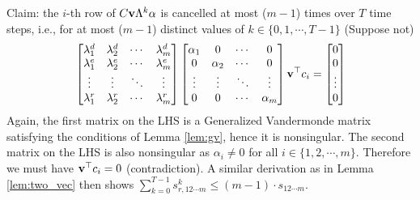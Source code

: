 \begin{pf}
Claim: the $i$-th row of $C{\bf v}\Lambda^k \alpha$ is cancelled at most ($m-1$) times over $T$ time steps, i.e., for at most ($m-1$) distinct values of $k \in \{0, 1, \cdots, T-1\}$
(Suppose not)
\begin{equation}
\begin{aligned}
	&	%
		\begin{bmatrix} \lambda_1^d & \lambda_2^d & \cdots & \lambda_m^d \\
					\lambda_1^e & \lambda_2^e & \cdots & \lambda_m^e \\
					\vdots & \vdots & \ddots & \vdots \\
					\lambda_1^r& \lambda_2^r & \cdots & \lambda_m^r 
		\end{bmatrix} %
		\begin{bmatrix} \alpha_1 & 0 & \cdots & 0 \\ 0 & \alpha_2 & \cdots & 0 \\ 
					\vdots & \vdots & \ddots & \vdots \\
					0 & 0 & \cdots & \alpha_m \end{bmatrix} 
					{\bf v}^\top c_i 
		= \begin{bmatrix} 0 \\ 0 \\ \vdots \\ 0 \end{bmatrix} \nonumber\\
\end{aligned}
\end{equation}
Again, the first matrix on the LHS is a Generalized Vandermonde matrix satisfying the conditions of Lemma \ref{lem:gv}, hence it is nonsingular. The second matrix on the LHS is also nonsingular as $\alpha_i \neq 0$ for all $i \in \{1, 2, \cdots, m\}$. Therefore we must have ${\bf v}^\top c_i = 0$ (contradiction). A similar derivation as in Lemma \ref{lem:two_vec} then shows $\sum_{k=0}^{T-1} s_{r,12\cdots m}^ k \le (m-1) \cdot s_{12\cdots m}$.
\end{pf}
